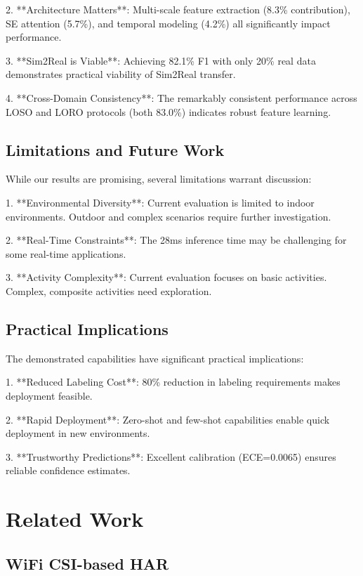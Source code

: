 \documentclass[journal]{IEEEtran}
\begin{document}
2. **Architecture Matters**: Multi-scale feature extraction (8.3\% contribution), SE attention (5.7\%), and temporal modeling (4.2\%) all significantly impact performance.

3. **Sim2Real is Viable**: Achieving 82.1\% F1 with only 20\% real data demonstrates practical viability of Sim2Real transfer.

4. **Cross-Domain Consistency**: The remarkably consistent performance across LOSO and LORO protocols (both 83.0\%) indicates robust feature learning.

\subsection{Limitations and Future Work}

While our results are promising, several limitations warrant discussion:

1. **Environmental Diversity**: Current evaluation is limited to indoor environments. Outdoor and complex scenarios require further investigation.

2. **Real-Time Constraints**: The 28ms inference time may be challenging for some real-time applications.

3. **Activity Complexity**: Current evaluation focuses on basic activities. Complex, composite activities need exploration.

\subsection{Practical Implications}

The demonstrated capabilities have significant practical implications:

1. **Reduced Labeling Cost**: 80\% reduction in labeling requirements makes deployment feasible.

2. **Rapid Deployment**: Zero-shot and few-shot capabilities enable quick deployment in new environments.

3. **Trustworthy Predictions**: Excellent calibration (ECE=0.0065) ensures reliable confidence estimates.

\section{Related Work}

\subsection{WiFi CSI-based HAR}
\end{document}
